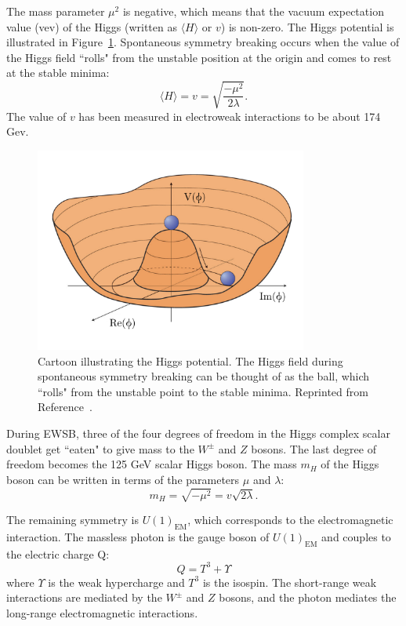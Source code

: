 The mass parameter $\mu^2$ is negative, which means that the vacuum expectation value (vev) of the Higgs (written as $\langle H \rangle$ or $v$) is non-zero. The Higgs potential is illustrated in Figure~\ref{fig:HiggsV}. Spontaneous symmetry breaking occurs when the value of the Higgs field ``rolls" from the unstable position at the origin and comes to rest at the stable minima:
\begin{equation}
\langle H \rangle= v = \sqrt{\frac{-\mu^2}{2\lambda}}.
\end{equation}
The value of $v$ has been measured in electroweak interactions to be about 174 Gev. 

\begin{figure}[htbp]
    \centering
    \includegraphics[width=0.8\textwidth]{Figures/Theory/improvedMexicanHat.pdf}
    \caption{Cartoon illustrating the Higgs potential. The Higgs field during spontaneous symmetry breaking can be thought of as the ball, which ``rolls" from the unstable point to the stable minima.
    Reprinted from Reference~\cite{mexicanHat}.}
    \label{fig:HiggsV}
\end{figure}

During EWSB, three of the four degrees of freedom in the Higgs complex scalar doublet get ``eaten" to give mass to the $W^\pm$ and $Z$ bosons. The last degree of freedom becomes the 125 GeV scalar Higgs boson. The mass $m_H$ of the Higgs boson can be written in terms of the parameters $\mu$ and $\lambda$: 
\begin{equation}
m_H = \sqrt{-\mu^2} = v\sqrt{2\lambda}.
\label{equ:HiggsMass}
\end{equation}

The remaining symmetry is $U(1)_{\textrm{EM}}$, which corresponds to the electromagnetic interaction. The massless photon is the gauge boson of $U(1)_{\textrm{EM}}$ and couples to the electric charge Q: 
\begin{equation}
Q = T^3 + \Upsilon
\end{equation}
where $\Upsilon$ is the weak hypercharge and $T^3$ is the isospin. The short-range weak interactions are mediated by the $W^\pm$ and $Z$ bosons, and the photon mediates the long-range electromagnetic interactions.

